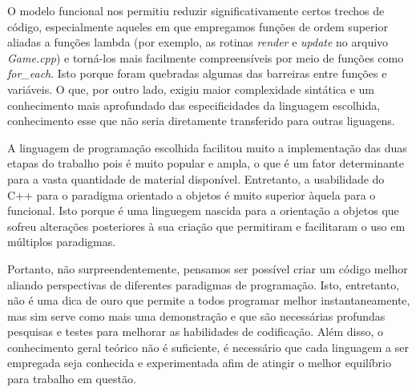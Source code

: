 \documentclass[rel_mlp]{iiufrgs}
\begin{document}
	O modelo funcional nos permitiu reduzir significativamente certos trechos de código, especialmente aqueles em que empregamos funções de ordem superior aliadas a funções lambda (por exemplo, as rotinas \textit{render} e \textit{update} no arquivo \textit{Game.cpp}) e torná-los mais facilmente compreensíveis por meio de funções como \textit{for\_each}. Isto porque foram quebradas algumas das barreiras entre funções e variáveis. O que, por outro lado, exigiu maior complexidade sintática e um conhecimento mais aprofundado das especificidades da linguagem escolhida, conhecimento esse que não seria diretamente transferido para outras liguagens.
	
	A linguagem de programação escolhida facilitou muito a implementação das duas etapas do trabalho pois é muito popular e ampla, o que é um fator determinante para a vasta quantidade de material disponível. Entretanto, a usabilidade do C++ para o paradigma orientado a objetos é muito superior àquela para o funcional. Isto porque é uma linguegem nascida para a orientação a objetos que sofreu alterações posteriores à sua criação que permitiram e facilitaram o uso em múltiplos paradigmas.
	
	Portanto, não surpreendentemente, pensamos ser possível criar um código melhor aliando perspectivas de diferentes paradigmas de programação. Isto, entretanto, não é uma dica de ouro que permite a todos programar melhor instantaneamente, mas sim serve como mais uma demonstração e que são necessárias profundas pesquisas e testes para melhorar as habilidades de codificação. Além disso, o conhecimento geral teórico não é suficiente, é necessário que cada linguagem a ser empregada seja conhecida e experimentada afim de atingir o melhor equilíbrio para trabalho em questão.




%

\end{document}
